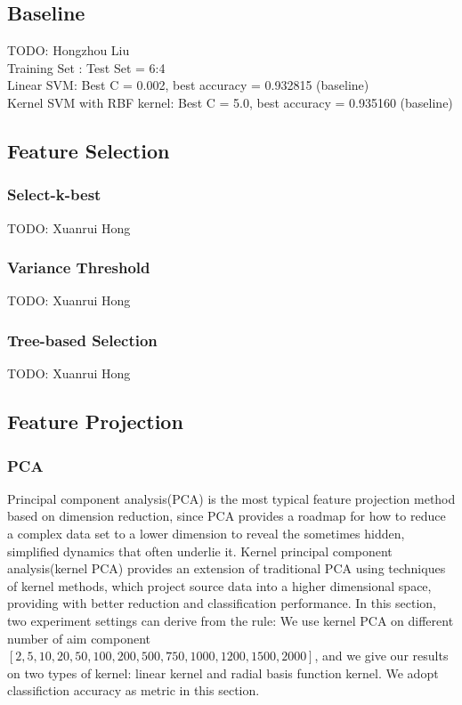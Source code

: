 \documentclass{article}
\begin{document}
\subsection{Baseline}
TODO: Hongzhou Liu\\
Training Set : Test Set = 6:4 \\
Linear SVM: Best C = 0.002, best accuracy = 0.932815 (baseline) \\
Kernel SVM with RBF kernel: Best C = 5.0, best accuracy = 0.935160 (baseline) \\
\subsection{Feature Selection}
\subsubsection{Select-k-best}
TODO: Xuanrui Hong\\
\subsubsection{Variance Threshold}
TODO: Xuanrui Hong\\
\subsubsection{Tree-based Selection}
TODO: Xuanrui Hong\\

\subsection{Feature Projection}
\subsubsection{PCA}
Principal component analysis(PCA) is the most typical feature projection method based on dimension reduction, since PCA provides a roadmap for how to reduce a complex data set to a lower dimension to reveal the sometimes hidden, simplified dynamics that often underlie it. Kernel principal component analysis(kernel PCA) provides an extension of traditional PCA using techniques of kernel methods, which project source data into a higher dimensional space, providing with better reduction and classification performance. In this section, two experiment settings can derive from the rule: We use kernel PCA on different number of aim component $[2, 5, 10, 20, 50, 100, 200, 500, 750, 1000, 1200, 1500, 2000]$, and we give our results on two types of kernel: linear kernel and radial basis function kernel. We adopt classifiction accuracy as metric in this section.
\end{document}
